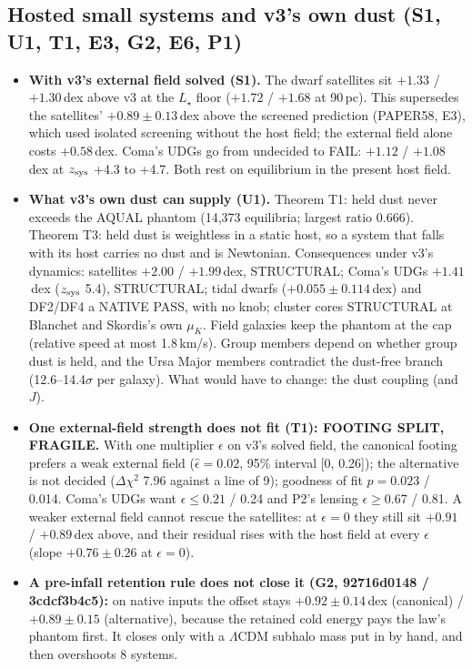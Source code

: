 \documentclass[10pt]{article}
\begin{document}
\subsection{Hosted small systems and v3's own dust (S1, U1, T1, E3, G2, E6, P1)}\label{sec:hosted}
\begin{itemize}
\item \textbf{With v3's external field solved (S1).} The dwarf satellites sit $+1.33$ / $+1.30$\,dex above v3 at the $L_\star$ floor ($+1.72$ / $+1.68$ at 90\,pc). This supersedes the satellites' $+0.89\pm0.13$\,dex above the screened prediction (PAPER58, E3), which used isolated screening without the host field; the external field alone costs $+0.58$\,dex. Coma's UDGs go from undecided to FAIL: $+1.12$ / $+1.08$\,dex at $z_{\rm sys}$ +4.3 to +4.7. Both rest on equilibrium in the present host field.
\item \textbf{What v3's own dust can supply (U1).} Theorem T1: held dust never exceeds the AQUAL phantom (14,373 equilibria; largest ratio 0.666). Theorem T3: held dust is weightless in a static host, so a system that falls with its host carries no dust and is Newtonian. Consequences under v3's dynamics: satellites $+2.00$ / $+1.99$\,dex, STRUCTURAL; Coma's UDGs $+1.41$\,dex ($z_{\rm sys}$ 5.4), STRUCTURAL; tidal dwarfs ($+0.055\pm0.114$\,dex) and DF2/DF4 a NATIVE PASS, with no knob; cluster cores STRUCTURAL at Blanchet and Skordis's own $\mu_K$. Field galaxies keep the phantom at the cap (relative speed at most 1.8\,km/s). Group members depend on whether group dust is held, and the Ursa Major members contradict the dust-free branch (12.6--14.4$\sigma$ per galaxy). What would have to change: the dust coupling (and $J$).
\item \textbf{One external-field strength does not fit (T1): FOOTING SPLIT, FRAGILE.} With one multiplier $\epsilon$ on v3's solved field, the canonical footing prefers a weak external field ($\hat\epsilon=0.02$, 95\% interval [0, 0.26]); the alternative is not decided ($\Delta\chi^2$ 7.96 against a line of 9); goodness of fit $p=0.023$ / 0.014. Coma's UDGs want $\epsilon\le0.21$ / 0.24 and P2's lensing $\epsilon\ge0.67$ / 0.81. A weaker external field cannot rescue the satellites: at $\epsilon=0$ they still sit $+0.91$ / $+0.89$\,dex above, and their residual rises with the host field at every $\epsilon$ (slope $+0.76\pm0.26$ at $\epsilon=0$).
\item \textbf{A pre-infall retention rule does not close it (G2, 92716d0148 / 3cdcf3b4c5):} on native inputs the offset stays $+0.92\pm0.14$\,dex (canonical) / $+0.89\pm0.15$ (alternative), because the retained cold energy pays the law's phantom first. It closes only with a $\Lambda$CDM subhalo mass put in by hand, and then overshoots 8 systems.

\end{itemize}
\end{document}
